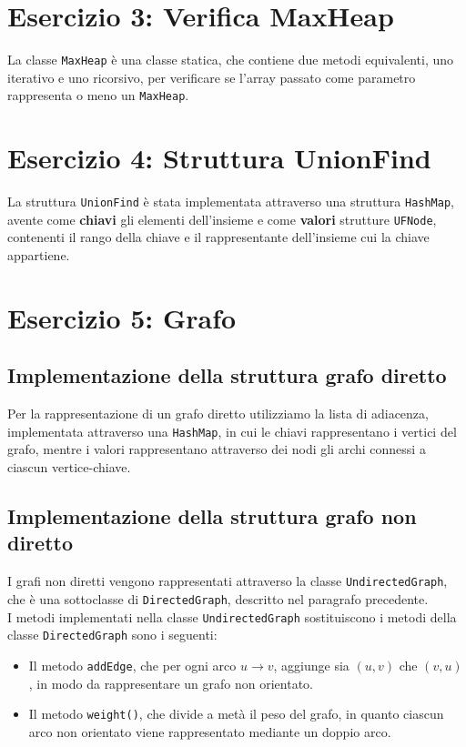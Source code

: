 \documentclass[10pt, oneside]{article}
\begin{document}
\section{Esercizio 3: Verifica MaxHeap}
La classe \texttt{MaxHeap} è una classe statica, che contiene due metodi equivalenti, uno iterativo e uno ricorsivo, per verificare se l'array passato come parametro rappresenta o meno un \texttt{MaxHeap}.

\section{Esercizio 4: Struttura UnionFind}
La struttura \texttt{UnionFind} è stata implementata attraverso una struttura \texttt{HashMap}, avente come \textbf{chiavi} gli elementi dell'insieme e come \textbf{valori} strutture \texttt{UFNode}, contenenti il rango della chiave e il rappresentante dell'insieme cui la chiave appartiene.\\

\section{Esercizio 5: Grafo}
\subsection{Implementazione della struttura grafo diretto}
Per la rappresentazione di un grafo diretto utilizziamo la lista di adiacenza, implementata attraverso una \texttt{HashMap}, in cui le chiavi rappresentano i vertici del grafo, mentre i valori rappresentano attraverso  dei nodi gli archi connessi a ciascun vertice-chiave.

\subsection{Implementazione della struttura grafo non diretto}
I grafi non diretti vengono rappresentati attraverso la classe \texttt{UndirectedGraph}, che è una sottoclasse di \texttt{DirectedGraph}, descritto nel paragrafo precedente.\\
I metodi implementati nella classe \texttt{UndirectedGraph} sostituiscono i metodi della classe  \texttt{DirectedGraph} sono i seguenti:
    \begin{itemize}
        \item{Il metodo \texttt{addEdge}, che per ogni arco $u \rightarrow v$, aggiunge sia $(u,v)$ che $(v, u)$, in modo da rappresentare un grafo non orientato.}
        \item{Il metodo \texttt{weight()}, che divide a metà il peso del grafo, in quanto ciascun arco non orientato viene rappresentato mediante un doppio arco.}
    \end{itemize}
\end{document}
